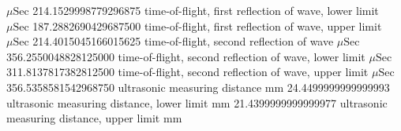 \expandafter\def\csname oct2tex.air_d25_v800_P.t2.u\endcsname{\ensuremath{\mu\text{Sec}}}
\expandafter\def\csname oct2tex.air_d25_v800_P.t2.v\endcsname{214.1529998779296875}
\expandafter\def\csname oct2tex.air_d25_v800_P.t2a.d\endcsname{time-of-flight, first reflection of wave, lower limit}
\expandafter\def\csname oct2tex.air_d25_v800_P.t2a.u\endcsname{\ensuremath{\mu\text{Sec}}}
\expandafter\def\csname oct2tex.air_d25_v800_P.t2a.v\endcsname{187.2882690429687500}
\expandafter\def\csname oct2tex.air_d25_v800_P.t2b.d\endcsname{time-of-flight, first reflection of wave, upper limit}
\expandafter\def\csname oct2tex.air_d25_v800_P.t2b.u\endcsname{\ensuremath{\mu\text{Sec}}}
\expandafter\def\csname oct2tex.air_d25_v800_P.t2b.v\endcsname{214.4015045166015625}
\expandafter\def\csname oct2tex.air_d25_v800_P.t3.d\endcsname{time-of-flight, second reflection of wave}
\expandafter\def\csname oct2tex.air_d25_v800_P.t3.u\endcsname{\ensuremath{\mu\text{Sec}}}
\expandafter\def\csname oct2tex.air_d25_v800_P.t3.v\endcsname{356.2550048828125000}
\expandafter\def\csname oct2tex.air_d25_v800_P.t3a.d\endcsname{time-of-flight, second reflection of wave, lower limit}
\expandafter\def\csname oct2tex.air_d25_v800_P.t3a.u\endcsname{\ensuremath{\mu\text{Sec}}}
\expandafter\def\csname oct2tex.air_d25_v800_P.t3a.v\endcsname{311.8137817382812500}
\expandafter\def\csname oct2tex.air_d25_v800_P.t3b.d\endcsname{time-of-flight, second reflection of wave, upper limit}
\expandafter\def\csname oct2tex.air_d25_v800_P.t3b.u\endcsname{\ensuremath{\mu\text{Sec}}}
\expandafter\def\csname oct2tex.air_d25_v800_P.t3b.v\endcsname{356.5358581542968750}
\expandafter\def\csname oct2tex.air_d25_v800_P.umd.d\endcsname{ultrasonic measuring distance}
\expandafter\def\csname oct2tex.air_d25_v800_P.umd.u\endcsname{\ensuremath{\text{mm}}}
\expandafter\def\csname oct2tex.air_d25_v800_P.umd.v\endcsname{24.4499999999999993}
\expandafter\def\csname oct2tex.air_d25_v800_P.umda.d\endcsname{ultrasonic measuring distance, lower limit}
\expandafter\def\csname oct2tex.air_d25_v800_P.umda.u\endcsname{\ensuremath{\text{mm}}}
\expandafter\def\csname oct2tex.air_d25_v800_P.umda.v\endcsname{21.4399999999999977}
\expandafter\def\csname oct2tex.air_d25_v800_P.umdb.d\endcsname{ultrasonic measuring distance, upper limit}
\expandafter\def\csname oct2tex.air_d25_v800_P.umdb.u\endcsname{\ensuremath{\text{mm}}}
